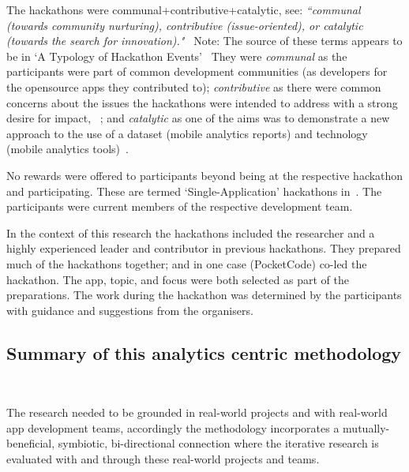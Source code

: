 The hackathons were communal+contributive+catalytic, see: \emph{``communal (towards  community  nurturing), contributive  (issue-oriented),  or  catalytic  (towards  the search  for  innovation)."}~\citep[p.3]{medina2020_what_do_we_know_about_hackathons_etc_a_SLR} Note: The source of these terms appears to be in `A Typology of Hackathon Events'~\citep[pp. 1-3]{drouhard2016_typology_of_hackathon_events} %
They were \emph{communal} as the participants were part of common development communities (as developers for the opensource apps they contributed to); \emph{contributive} as there were common concerns about the issues the hackathons were intended to address with a strong desire for impact, ~\citep[see p.2]{drouhard2016_typology_of_hackathon_events}; and \emph{catalytic} as one of the aims was to demonstrate a new approach to the use of a dataset (mobile analytics reports) and technology (mobile analytics tools)~\citep[see p.3]{drouhard2016_typology_of_hackathon_events}.

No rewards were offered to participants beyond being at the respective hackathon and participating. These are termed `Single-Application' hackathons in~\citealt[p.5]{briscoe2014_digital_innovation_the_hackathon_phenomenon}. The participants were current members of the respective development team.

In the context of this research the hackathons included the researcher and a highly experienced leader and contributor in previous hackathons. They prepared much of the hackathons together; and in one case (PocketCode) co-led the hackathon. The app, topic, and focus were both selected as part of the preparations. The work during the hackathon was determined by the participants with guidance and suggestions from the organisers.


 

\subsection{Summary of this analytics centric methodology}~\label{analytics-centric-methodology-section}

The research needed to be grounded in real-world projects and with real-world app development teams, accordingly the methodology incorporates a mutually-beneficial, symbiotic, bi-directional connection where the iterative research is evaluated with and through these real-world projects and teams. 

